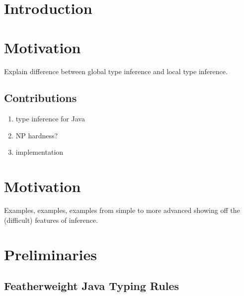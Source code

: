 \documentclass[acmsmall,screen,review]{acmart}
\begin{document}


\maketitle

\section{Introduction}
\label{sec:introduction}


\section{Motivation}

Explain difference between global type inference and local type
inference. 

\subsection{Contributions}
\label{sec:contributions}

\begin{enumerate}
\item type inference for Java
\item NP hardness?
\item implementation
\end{enumerate}

\section{Motivation}
\label{sec:motivation}

Examples, examples, examples from simple to more advanced showing off
the (difficult) features of inference.

\section{Preliminaries}
\label{sec:preliminaries}

\subsection{Featherweight Java Typing Rules}

\end{document}

